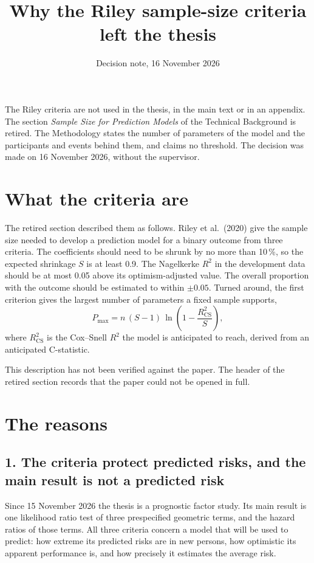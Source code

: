 \documentclass[11pt]{article}
\title{Why the Riley sample-size criteria left the thesis}
\author{Decision note, 16 November 2026}
\date{}
\begin{document}
\maketitle

\begin{decision}
The Riley criteria are not used in the thesis, in the main text or in an appendix.
The section \emph{Sample Size for Prediction Models} of the Technical Background is retired.
The Methodology states the number of parameters of the model and the participants and events behind
them, and claims no threshold.
The decision was made on 16 November 2026, without the supervisor.
\end{decision}

\section{What the criteria are}

The retired section described them as follows.
Riley et al.\ (2020) give the sample size needed to develop a prediction model for a binary
outcome from three criteria.
The coefficients should need to be shrunk by no more than 10\,\%, so the expected shrinkage $S$ is at
least 0.9.
The Nagelkerke $R^2$ in the development data should be at most 0.05 above its optimism-adjusted value.
The overall proportion with the outcome should be estimated to within $\pm 0.05$.
Turned around, the first criterion gives the largest number of parameters a fixed sample supports,
\[
  P_{\max} = n\,(S-1)\,\ln\!\left(1 - \frac{R^2_{\mathrm{CS}}}{S}\right),
\]
where $R^2_{\mathrm{CS}}$ is the Cox--Snell $R^2$ the model is anticipated to reach, derived from an
anticipated C-statistic.

This description has not been verified against the paper.
The header of the retired section records that the paper could not be opened in full.

\section{The reasons}

\subsection*{1. The criteria protect predicted risks, and the main result is not a predicted risk}

Since 15 November 2026 the thesis is a prognostic factor study.
Its main result is one likelihood ratio test of three prespecified geometric terms, and the hazard
ratios of those terms.
All three criteria concern a model that will be used to predict: how extreme its predicted risks
are in new persons, how optimistic its apparent performance is, and how precisely it estimates the
average risk.
\end{document}
